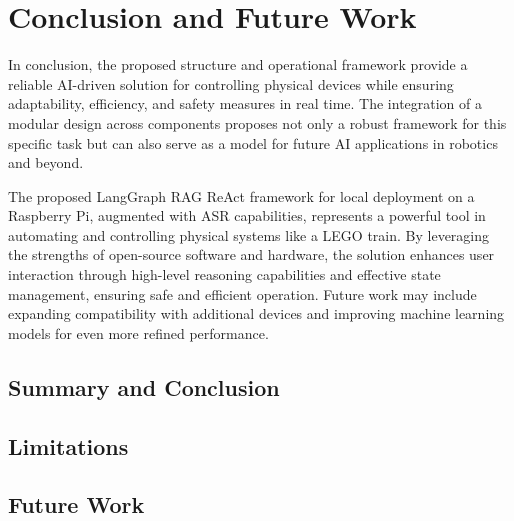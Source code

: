 \chapter{Conclusion and Future Work}
\label{ch:conclusion}

In conclusion, the proposed structure and operational framework provide a reliable AI-driven solution for controlling physical devices while ensuring adaptability, efficiency, and safety measures in real time. The integration of a modular design across components proposes not only a robust framework for this specific task but can also serve as a model for future AI applications in robotics and beyond.

The proposed LangGraph RAG ReAct framework for local deployment on a Raspberry Pi, augmented with ASR capabilities, represents a powerful tool in automating and controlling physical systems like a LEGO train. By leveraging the strengths of open-source software and hardware, the solution enhances user interaction through high-level reasoning capabilities and effective state management, ensuring safe and efficient operation. Future work may include expanding compatibility with additional devices and improving machine learning models for even more refined performance.

%
%
\section{Summary and Conclusion}
\label{sec:conclusion:summary}

%
%
\section{Limitations}
\label{sec:conclusion:limitations}


%
%
\section{Future Work}
\label{sec:conclusion:future_work}
